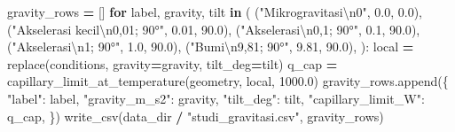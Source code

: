 \documentclass[
  12pt,a4paper,oneside]{report}
\newenvironment{Shaded}{\begin{snugshade}}{\end{snugshade}}
\newcommand{\CharTok}[1]{\textcolor[rgb]{0.31,0.60,0.02}{#1}}
\newcommand{\ControlFlowTok}[1]{\textcolor[rgb]{0.13,0.29,0.53}{\textbf{#1}}}
\newcommand{\FloatTok}[1]{\textcolor[rgb]{0.00,0.00,0.81}{#1}}
\newcommand{\KeywordTok}[1]{\textcolor[rgb]{0.13,0.29,0.53}{\textbf{#1}}}
\newcommand{\NormalTok}[1]{#1}
\newcommand{\OperatorTok}[1]{\textcolor[rgb]{0.81,0.36,0.00}{\textbf{#1}}}
\newcommand{\StringTok}[1]{\textcolor[rgb]{0.31,0.60,0.02}{#1}}
\begin{document}
\begin{Shaded}
\begin{Highlighting}[]
\NormalTok{    gravity\_rows }\OperatorTok{=}\NormalTok{ []}
    \ControlFlowTok{for}\NormalTok{ label, gravity, tilt }\KeywordTok{in}\NormalTok{ (}
\NormalTok{        (}\StringTok{"Mikrogravitasi}\CharTok{\textbackslash{}n}\StringTok{0"}\NormalTok{, }\FloatTok{0.0}\NormalTok{, }\FloatTok{0.0}\NormalTok{),}
\NormalTok{        (}\StringTok{"Akselerasi kecil}\CharTok{\textbackslash{}n}\StringTok{0,01; 90°"}\NormalTok{, }\FloatTok{0.01}\NormalTok{, }\FloatTok{90.0}\NormalTok{),}
\NormalTok{        (}\StringTok{"Akselerasi}\CharTok{\textbackslash{}n}\StringTok{0,1; 90°"}\NormalTok{, }\FloatTok{0.1}\NormalTok{, }\FloatTok{90.0}\NormalTok{),}
\NormalTok{        (}\StringTok{"Akselerasi}\CharTok{\textbackslash{}n}\StringTok{1; 90°"}\NormalTok{, }\FloatTok{1.0}\NormalTok{, }\FloatTok{90.0}\NormalTok{),}
\NormalTok{        (}\StringTok{"Bumi}\CharTok{\textbackslash{}n}\StringTok{9,81; 90°"}\NormalTok{, }\FloatTok{9.81}\NormalTok{, }\FloatTok{90.0}\NormalTok{),}
\NormalTok{    ):}
\NormalTok{        local }\OperatorTok{=}\NormalTok{ replace(conditions, gravity}\OperatorTok{=}\NormalTok{gravity, tilt\_deg}\OperatorTok{=}\NormalTok{tilt)}
\NormalTok{        q\_cap }\OperatorTok{=}\NormalTok{ capillary\_limit\_at\_temperature(geometry, local, }\FloatTok{1000.0}\NormalTok{)}
\NormalTok{        gravity\_rows.append(\{}
            \StringTok{"label"}\NormalTok{: label, }\StringTok{"gravity\_m\_s2"}\NormalTok{: gravity, }\StringTok{"tilt\_deg"}\NormalTok{: tilt,}
            \StringTok{"capillary\_limit\_W"}\NormalTok{: q\_cap,}
\NormalTok{        \})}
\NormalTok{    write\_csv(data\_dir }\OperatorTok{/} \StringTok{"studi\_gravitasi.csv"}\NormalTok{, gravity\_rows)}


\end{Highlighting}
\end{Shaded}
\end{document}
